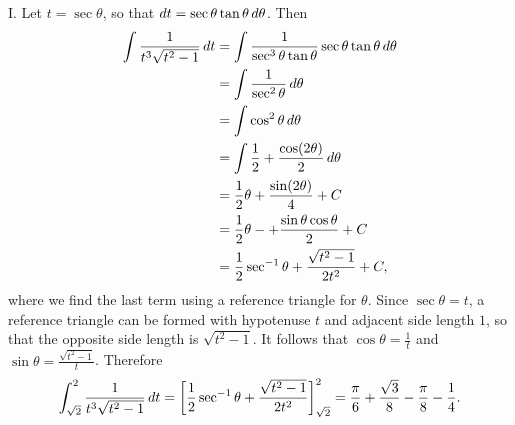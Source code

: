 \documentclass[]{ximera}
\begin{document}
\begin{freeResponse}
I. Let $t = \sec \theta$, so that $\mathop{}\!d t = \sec \theta \tan \theta \mathop{}\!d \theta$. Then
\begin{align*}
\int \frac{1}{t^3\sqrt{t^2-1}} \mathop{}\!d t &= \int \frac{1}{\sec^3 \theta \tan \theta} \sec \theta \tan \theta \mathop{}\!d \theta \\
&= \int \frac{1}{\sec^2 \theta} \mathop{}\!d \theta \\
&= \int \cos^2 \theta \mathop{}\!d \theta \\
&= \int \frac{1}{2} + \frac{\cos (2 \theta)}{2} \mathop{}\!d \theta \\
&= \frac{1}{2}\theta + \frac{\sin (2\theta)}{4} + C \\
&= \frac{1}{2} \theta-+\frac{\sin \theta \cos \theta}{2} + C \\
&= \frac{1}{2} \sec^{-1}\theta + \frac{\sqrt{t^2-1}}{2t^2} + C,
\end{align*}
where we find the last term using a reference triangle for $\theta$. Since $\sec \theta = t$, a reference triangle can be formed with hypotenuse $t$ and adjacent side length $1$, so that the opposite side length is $\sqrt{t^2-1}$. It follows that $\cos \theta = \frac{1}{t}$ and $\sin \theta = \frac{\sqrt{t^2-1}}{t}$. Therefore
$$
\int_{\sqrt{2}}^2 \frac{1}{t^3 \sqrt{t^2 -1}} \mathop{}\!d t = \bigg[ \frac{1}{2} \sec^{-1}\theta + \frac{\sqrt{t^2-1}}{2t^2} \bigg]_{\sqrt{2}}^2 = \frac{\pi}{6} + \frac{\sqrt{3}}{8} -  \frac{\pi}{8} - \frac{1}{4}.
$$



\end{freeResponse}
\end{document}
